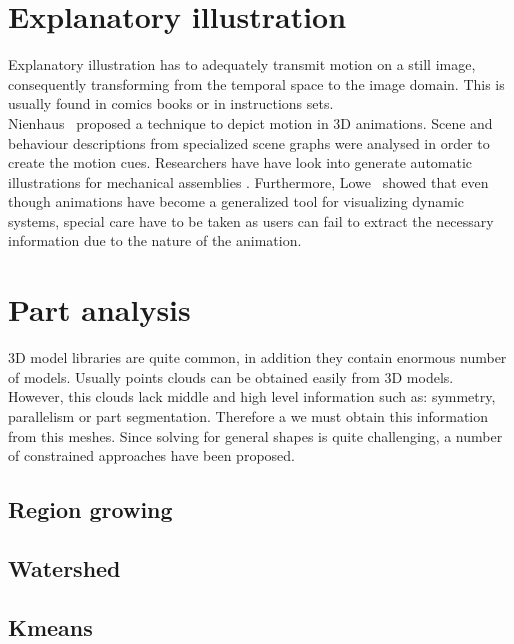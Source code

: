 \section{Explanatory illustration}

Explanatory illustration has to adequately transmit motion on a still image, consequently transforming from the temporal space to the image domain.
This is usually found in comics books or in instructions sets.\\

Nienhaus~\cite{Nienhaus2005} proposed a technique to depict motion in 3D animations.
Scene and behaviour descriptions from specialized scene graphs were analysed in order to create the motion cues.  
Researchers have have look into generate automatic illustrations for mechanical assemblies \cite{Mitra2010}.
Furthermore, Lowe~\cite{Lowe2014} showed that even though animations have become a generalized tool for visualizing dynamic systems, special care have to be taken as users can fail to extract the necessary information due to the nature of the animation.

\section{Part analysis}

3D model libraries are quite common, in addition they contain enormous number of models.   
Usually points clouds can be obtained easily from 3D models.
However, this clouds lack middle and high level information such as: symmetry, parallelism or part segmentation.
Therefore a we must obtain this information from this meshes.
Since solving for general shapes is quite challenging, a number of constrained approaches have been proposed.\\

\subsection{Region growing}

\subsection{Watershed}

\subsection{Kmeans}


